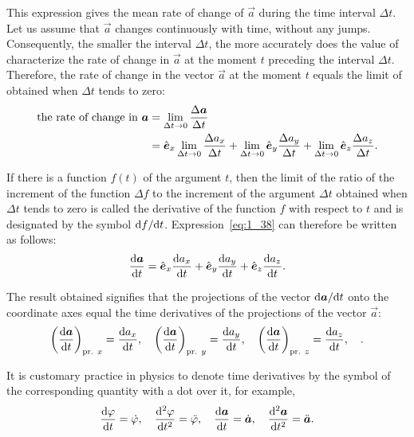\noindent
This expression gives the mean rate of change of $\vec{a}$ during the time interval $\Delta t$. Let us assume that $\vec{a}$ changes continuously with time, without any jumps. Consequently, the smaller the interval $\Delta t$, the more accurately does the value of  characterize the rate of change in $\vec{a}$ at the moment $t$ preceding the interval $\Delta t$. Therefore, the rate of change in the vector $\vec{a}$ at the moment $t$ equals the limit of  obtained when $\Delta t$ tends to zero:
\begin{align}
\text{the rate of change in }\boldsymbol{a} &= \lim_{\Delta t\to 0}\frac{\Delta\boldsymbol{a}}{\Delta t} \nonumber\\
&= \hat{\boldsymbol{e}}_{x} \lim_{\Delta t\to 0}\frac{\Delta a_x}{\Delta t} + \lim_{\Delta t\to 0}\hat{\boldsymbol{e}}_{y} \frac{\Delta a_y}{\Delta t} + \lim_{\Delta t\to 0}\hat{\boldsymbol{e}}_{z} \frac{\Delta a_z}{\Delta t}.\label{eq:1_38}
\end{align}

If there is a function $f(t)$ of the argument $t$, then the limit of the ratio of the increment of the function $\Delta f$ to the increment of the argument $\Delta t$ obtained when $\Delta t$ tends to zero is called the derivative of the function $f$ with respect to $t$ and is designated by the symbol $\mathrm{d} f/\mathrm{d} t$. Expression~\eqref{eq:1_38} can therefore be written as follows:
\begin{equation}\label{eq:1_39}
\frac{\mathrm{d}\boldsymbol{a}}{\mathrm{d} t} = \hat{\boldsymbol{e}}_{x}\frac{\mathrm{d} a_x}{\mathrm{d} t} + \hat{\boldsymbol{e}}_{y}\frac{\mathrm{d} a_y}{\mathrm{d} t} + \hat{\boldsymbol{e}}_{z}\frac{\mathrm{d} a_z}{\mathrm{d} t}.
\end{equation}

\noindent
The result obtained signifies that the projections of the vector $\mathrm{d}\boldsymbol{a}/\mathrm{d} t$ onto the coordinate axes equal the time derivatives of the projections of the vector $\vec{a}$:
\begin{equation}\label{eq:1_40}
\left(\frac{\mathrm{d}\boldsymbol{a}}{\mathrm{d} t}\right)_{\text{pr. }x} = \frac{\mathrm{d} a_x}{\mathrm{d} t},\quad \left(\frac{\mathrm{d}\boldsymbol{a}}{\mathrm{d} t}\right)_{\text{pr. }y} = \frac{\mathrm{d} a_y}{\mathrm{d} t},\quad \left(\frac{\mathrm{d}\boldsymbol{a}}{\mathrm{d} t}\right)_{\text{pr. }z} = \frac{\mathrm{d} a_z}{\mathrm{d} t},\quad.
\end{equation}

It is customary practice in physics to denote time derivatives by the symbol of the corresponding quantity with a dot over it, for example,
\begin{equation}\label{eq:1_41}
\frac{\mathrm{d}\varphi}{\mathrm{d} t} = \dot{\varphi},\quad \frac{\mathrm{d}^2\varphi}{\mathrm{d} t^2} = \ddot{\varphi},\quad \frac{\mathrm{d}\boldsymbol{a}}{\mathrm{d} t} = \dot{\boldsymbol{a}},\quad \frac{\mathrm{d}^2\boldsymbol{a}}{\mathrm{d} t^2} = \ddot{\boldsymbol{a}}.
\end{equation}

